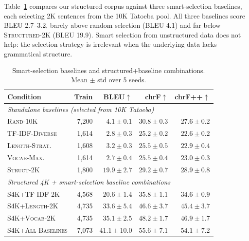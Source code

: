 \documentclass[11pt]{article}
\begin{document}
Table~\ref{tab:baselines} compares our structured corpus against three smart-selection baselines, each selecting 2K sentences from the 10K Tatoeba pool. All three baselines score BLEU 2.7--3.2, barely above random selection (BLEU 4.1) and far below \textsc{Structured-2K} (BLEU 19.9). Smart selection from unstructured data does not help: the selection strategy is irrelevant when the underlying data lacks grammatical structure.

\begin{table}[t]
\centering
\small
\caption{Smart-selection baselines and structured+baseline combinations. Mean $\pm$ std over 5 seeds.}
\label{tab:baselines}
\begin{tabular}{lrrrr}
\toprule
\textbf{Condition} & \textbf{Train} & \textbf{BLEU}$\uparrow$ & \textbf{chrF}$\uparrow$ & \textbf{chrF++}$\uparrow$ \\
\midrule
\multicolumn{5}{l}{\textit{Standalone baselines (selected from 10K Tatoeba)}} \\
\textsc{Rand-10K}         & 7,200 & $4.1 \pm 0.1$  & $30.8 \pm 0.3$ & $27.6 \pm 0.2$ \\
\textsc{TF-IDF-Diverse}   & 1,614 & $2.8 \pm 0.3$  & $25.2 \pm 0.2$ & $22.6 \pm 0.2$ \\
\textsc{Length-Strat.}     & 1,608 & $3.2 \pm 0.3$  & $25.5 \pm 0.5$ & $22.9 \pm 0.4$ \\
\textsc{Vocab-Max.}       & 1,614 & $2.7 \pm 0.4$  & $25.5 \pm 0.4$ & $23.0 \pm 0.3$ \\
\textsc{Struct-2K}         & 1,800 & $19.9 \pm 2.7$ & $29.2 \pm 0.7$ & $28.9 \pm 0.8$ \\
\midrule
\multicolumn{5}{l}{\textit{Structured 4K + smart-selection baseline combinations}} \\
\textsc{S4K+TF-IDF-2K}    & 4,568 & $20.6 \pm 1.4$ & $35.8 \pm 1.1$ & $34.6 \pm 0.9$ \\
\textsc{S4K+Length-2K}     & 4,735 & $33.6 \pm 5.4$ & $46.6 \pm 3.7$ & $45.4 \pm 3.7$ \\
\textsc{S4K+Vocab-2K}     & 4,735 & $35.1 \pm 2.5$ & $48.2 \pm 1.7$ & $46.9 \pm 1.7$ \\
\textsc{S4K+All-Baselines} & 7,073 & $\mathbf{41.1 \pm 10.0}$ & $\mathbf{55.6 \pm 7.1}$ & $\mathbf{54.1 \pm 7.2}$ \\
\bottomrule
\end{tabular}
\end{table}
\end{document}
